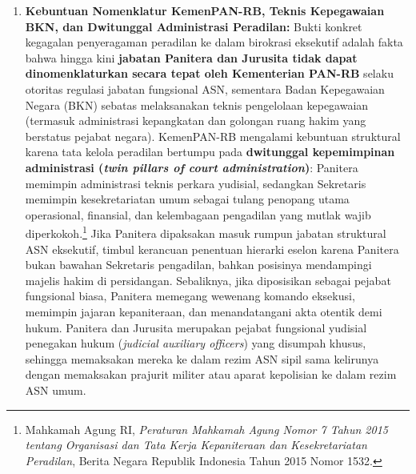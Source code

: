 \documentclass[12pt,a4paper,twocolumn]{article}
\begin{document}
\begin{enumerate}
          Ketimpangan distribusi inilah yang memaksa meluasnya diskresi penerbitan \textbf{Surat Izin Hakim Tunggal} oleh Ketua Mahkamah Agung serta memicu beban kerja berlebih (\textit{overload}) bagi hakim senior di satker besar. Oleh karena itu, Indonesia mendesak mengadopsi skema \textbf{residensi yudisial (\textit{judicial residency})} selama 2--3 tahun dengan menempatkan hakim pemula terlebih dahulu sebagai \textbf{anggota majelis di Pengadilan Kelas IA dan Kelas IA Khusus}. Skema ini memberikan manfaat ganda: secara operasional langsung menambal defisit majelis hakim pada satker berbeban perkara tinggi guna menekan ketergantungan pada persidangan hakim tunggal, dan secara substantif mempercepat kematangan teknis hakim junior di bawah supervisi beragam hakim senior pada perkara-perkara rumit. Secara filosofis, keadilan bukanlah ajang coba-coba teori (\textit{trial and error}): kesalahan yudisial menyangkut hak asasi manusia tidak boleh ditoleransi (\textit{zero tolerance on judicial miscarriage}). Setelah menuntaskan masa residensi di Kelas IA/IA Khusus, barulah mereka didistribusikan secara berkeadilan ke Pengadilan Kelas II atau dipromosikan memimpin majelis, ditopang jaminan fasilitas rumah dinas dan insentif kemahalan yang layak.
    \item \textbf{Kebuntuan Nomenklatur KemenPAN-RB, Teknis Kepegawaian BKN, dan Dwitunggal Administrasi Peradilan:} Bukti konkret kegagalan penyeragaman peradilan ke dalam birokrasi eksekutif adalah fakta bahwa hingga kini \textbf{jabatan Panitera dan Jurusita tidak dapat dinomenklaturkan secara tepat oleh Kementerian PAN-RB} selaku otoritas regulasi jabatan fungsional ASN, sementara Badan Kepegawaian Negara (BKN) sebatas melaksanakan teknis pengelolaan kepegawaian (termasuk administrasi kepangkatan dan golongan ruang hakim yang berstatus pejabat negara). KemenPAN-RB mengalami kebuntuan struktural karena tata kelola peradilan bertumpu pada \textbf{dwitunggal kepemimpinan administrasi (\textit{twin pillars of court administration})}: Panitera memimpin administrasi teknis perkara yudisial, sedangkan Sekretaris memimpin kesekretariatan umum sebagai tulang penopang utama operasional, finansial, dan kelembagaan pengadilan yang mutlak wajib diperkokoh.\footnote{Mahkamah Agung RI, \textit{Peraturan Mahkamah Agung Nomor 7 Tahun 2015 tentang Organisasi dan Tata Kerja Kepaniteraan dan Kesekretariatan Peradilan}, Berita Negara Republik Indonesia Tahun 2015 Nomor 1532.} Jika Panitera dipaksakan masuk rumpun jabatan struktural ASN eksekutif, timbul kerancuan penentuan hierarki eselon karena Panitera bukan bawahan Sekretaris pengadilan, bahkan posisinya mendampingi majelis hakim di persidangan. Sebaliknya, jika diposisikan sebagai pejabat fungsional biasa, Panitera memegang wewenang komando eksekusi, memimpin jajaran kepaniteraan, dan menandatangani akta otentik demi hukum. Panitera dan Jurusita merupakan pejabat fungsional yudisial penegakan hukum (\textit{judicial auxiliary officers}) yang disumpah khusus, sehingga memaksakan mereka ke dalam rezim ASN sipil sama kelirunya dengan memaksakan prajurit militer atau aparat kepolisian ke dalam rezim ASN umum.


\end{enumerate}
\end{document}
